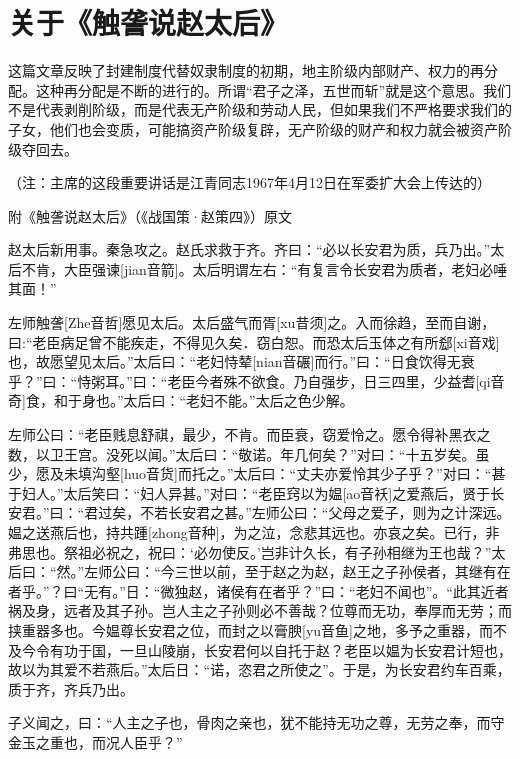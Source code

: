 \section[关于《触詟说赵太后》（一九六七年四月）]{关于《触詟说赵太后》}


这篇文章反映了封建制度代替奴隶制度的初期，地主阶级内部财产、权力的再分配。这种再分配是不断的进行的。所谓“君子之泽，五世而斩”就是这个意思。我们不是代表剥削阶级，而是代表无产阶级和劳动人民，但如果我们不严格要求我们的子女，他们也会变质，可能搞资产阶级复辟，无产阶级的财产和权力就会被资产阶级夺回去。

（注：主席的这段重要讲话是江青同志1967年4月12日在军委扩大会上传达的）

附《触詟说赵太后》（《战国策·赵策四》）原文

赵太后新用事。秦急攻之。赵氏求救于齐。齐曰：“必以长安君为质，兵乃出。”太后不肯，大臣强谏[jian音箭]。太后明谓左右：“有复言令长安君为质者，老妇必唾其面！”

左师触詟[Zhe音哲]愿见太后。太后盛气而胥[xu昔须]之。入而徐趋，至而自谢，曰:“老臣病足曾不能疾走，不得见久矣．窃白恕。而恐太后玉体之有所郄[xi音戏]也，故愿望见太后。”太后曰：“老妇恃辇[nian音碾]而行。”曰：“日食饮得无衰乎？”曰：“恃粥耳。”曰：“老臣今者殊不欲食。乃自强步，日三四里，少益耆[qi音奇]食，和于身也。”太后曰：“老妇不能。”太后之色少解。

左师公曰：“老臣贱息舒祺，最少，不肯。而臣衰，窃爱怜之。愿令得补黑衣之数，以卫王宫。没死以闻。”太后曰：“敬诺。年几何矣？”对曰：“十五岁矣。虽少，愿及未填沟壑[huo音货]而托之。”太后曰：“丈夫亦爱怜其少子乎？”对曰：“甚于妇人。”太后笑曰：“妇人异甚。”对曰：“老臣窍以为媪[ao音袄]之爱燕后，贤于长安君。”曰：“君过矣，不若长安君之甚。”左师公曰：“父母之爱子，则为之计深远。媪之送燕后也，持共踵[zhong音种]，为之泣，念悲其远也。亦哀之矣。已行，非弗思也。祭祖必祝之，祝曰：‘必勿使反。’岂非计久长，有子孙相继为王也哉？”太后曰：“然。”左师公曰：“今三世以前，至于赵之为赵，赵王之子孙侯者，其继有在者乎。”？曰“无有。”日：“微独赵，诸侯有在者乎？”曰：“老妇不闻也”。“此其近者祸及身，远者及其子孙。岂人主之子孙则必不善哉？位尊而无功，奉厚而无劳；而挟重器多也。今媪尊长安君之位，而封之以膏腴[yu音鱼]之地，多予之重器，而不及今令有功于国，一旦山陵崩，长安君何以自托于赵？老臣以媪为长安君计短也，故以为其爱不若燕后。”太后日：“诺，恣君之所使之”。于是，为长安君约车百乘，质于齐，齐兵乃出。

子义闻之，曰：“人主之子也，骨肉之亲也，犹不能持无功之尊，无劳之奉，而守金玉之重也，而况人臣乎？”

